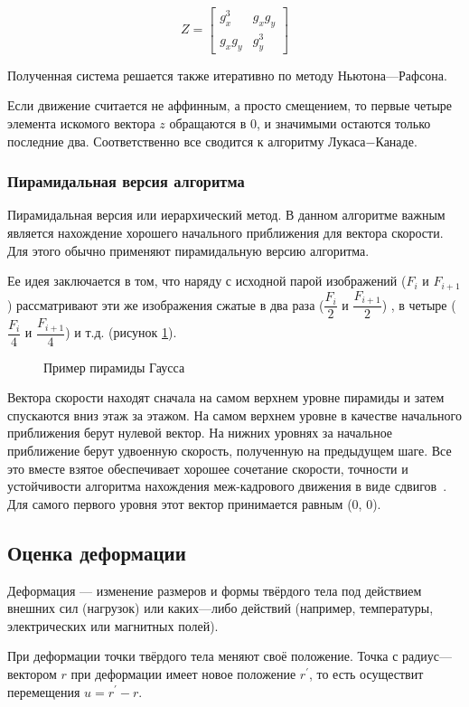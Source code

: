 $$Z=\begin{bmatrix}
g^3_x & g_xg_y \\
g_xg_y & g^3_y
\end{bmatrix}$$

Полученная система решается также итеративно по методу Ньютона—Рафсона.

Если движение считается не аффинным, а просто смещением, то первые четыре элемента искомого вектора $z$ обращаются в 0, и значимыми остаются только последние два. Соответственно все сводится к алгоритму Лукаса−Канаде.
\subsubsection{Пирамидальная версия алгоритма}
\label{subsec:pyramid}
Пирамидальная версия или иерархический метод. В данном алгоритме важным является нахождение хорошего начального приближения для вектора скорости. Для этого обычно применяют пирамидальную версию алгоритма. 

Ее идея заключается в том, что наряду с исходной парой изображений ($F_i$ и $F_{i+1}$) рассматривают эти же изображения сжатые в два раза ($\dfrac{F_i}{2}$ и $\dfrac{F_{i+1}}{2}$) , в четыре ($\dfrac{F_i}{4}$ и $\dfrac{F_{i+1}}{4}$) и т.д. (рисунок \ref{pic:pyramid}).
\begin{figure}[ht]
\caption{Пример пирамиды Гаусса}
\label{pic:pyramid}
\end{figure}

Вектора скорости находят сначала на самом верхнем уровне пирамиды и затем спускаются вниз этаж за этажом. На самом верхнем уровне в качестве начального приближения берут нулевой вектор. На нижних уровнях за начальное приближение берут удвоенную скорость, полученную на предыдущем шаге. Все это вместе взятое обеспечивает хорошее сочетание скорости, точности и устойчивости алгоритма нахождения меж-кадрового движения в виде сдвигов~\cite{Bouguet2000}. Для самого первого уровня этот вектор принимается равным (0, 0).

\subsection{Оценка деформации}
Деформация — изменение размеров и формы твёрдого тела под действием внешних сил (нагрузок) или каких—либо действий (например, температуры, электрических или магнитных полей).

При деформации точки твёрдого тела меняют своё положение. Точка с радиус—вектором $r$ при деформации имеет новое положение $r^{'}$, то есть осуществит перемещения $u = r^{'} - r$. 

